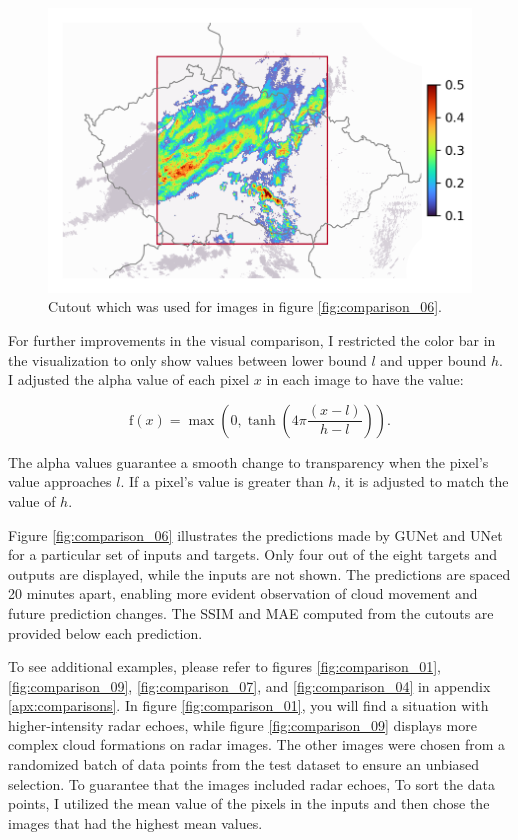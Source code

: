 \begin{figure}[ht]
    \centering
    \includegraphics[width=\textwidth]{images/comparison_square_06_cutout.png}
    \caption[Cutout which was used for the comparisons of predictions]{\label{fig:comparison_06_cutout}Cutout which was used for images in figure \ref{fig:comparison_06}.}
\end{figure}

 For further improvements in the visual comparison, I restricted the color bar in the visualization to only show values between lower bound $l$ and upper bound $h$. I adjusted the alpha value of each pixel $x$ in each image to have the value:

\begin{equation}
    \text{f}(x)=\max\left(0,\tanh\left(4\pi\frac{\left(x-l\right)}{h-l}\right)\right).
\end{equation}

 The alpha values guarantee a smooth change to transparency when the pixel's value approaches $l$. If a pixel's value is greater than $h$, it is adjusted to match the value of $h$.

Figure \ref{fig:comparison_06} illustrates the predictions made by \gls{GUNet} and UNet for a particular set of inputs and targets. Only four out of the eight targets and outputs are displayed, while the inputs are not shown. The predictions are spaced 20 minutes apart, enabling more evident observation of cloud movement and future prediction changes. The \gls{SSIM} and \gls{MAE} computed from the cutouts are provided below each prediction.

To see additional examples, please refer to figures \ref{fig:comparison_01}, \ref{fig:comparison_09}, \ref{fig:comparison_07}, and \ref{fig:comparison_04} in appendix \ref{apx:comparisons}. In figure \ref{fig:comparison_01}, you will find a situation with higher-intensity radar echoes, while figure \ref{fig:comparison_09} displays more complex cloud formations on radar images. The other images were chosen from a randomized batch of data points from the test dataset to ensure an unbiased selection. To guarantee that the images included radar echoes, To sort the data points, I utilized the mean value of the pixels in the inputs and then chose the images that had the highest mean values.

